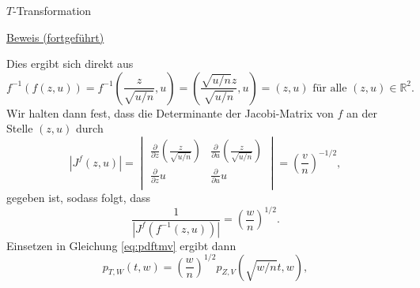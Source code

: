 \documentclass[
  8pt,
  ignorenonframetext,
]{beamer}
\begin{document}
\begin{frame}{\(T\)-Transformation}
\protect\hypertarget{t-transformation-5}{}
\footnotesize

\underline{Beweis (fortgeführt)} \vspace{1mm}

Dies ergibt sich direkt aus \begin{equation}
f^{-1}(f(z,u))
=
f^{-1}\left(\frac{z}{\sqrt{u/n}},u\right)
=
\left(\frac{\sqrt{u/n}z}{\sqrt{u/n}}, u \right)
=
(z,u)
\mbox{ für alle }
(z,u)
\in \mathbb{R}^2.
\end{equation} Wir halten dann fest, dass die Determinante der
Jacobi-Matrix von \(f\) an der Stelle \((z,u)\) durch \begin{equation}
|J^f(z,u)|
=
\begin{vmatrix}
  \frac{\partial}{\partial z} \left(\frac{z}{\sqrt{u/n}}\right)
& \frac{\partial}{\partial u} \left(\frac{z}{\sqrt{u/n}}\right) \\
  \frac{\partial}{\partial z} u
& \frac{\partial}{\partial u} u\\
\end{vmatrix}
= \left(\frac{v}{n}\right)^{-1/2},
\end{equation} gegeben ist, sodass folgt, dass \begin{equation}
\frac{1}{|J^f\left(f^{-1}(z,u)\right)|}
= \left(\frac{w}{n}\right)^{1/2}.
\end{equation} Einsetzen in Gleichung \eqref{eq:pdftmv} ergibt dann
\begin{equation}
p_{T,W}(t,w) = \left(\frac{w}{n}\right)^{1/2}p_{Z,V}\left(\sqrt{w/n}t,w\right),
\end{equation}
\end{frame}
\end{document}
